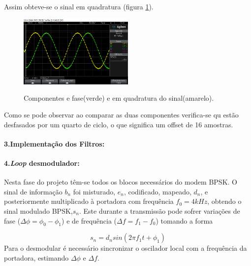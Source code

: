 \documentclass[11pt]{article}
\numberwithin{equation}{section}
\begin{document}
Assim obteve-se o sinal em quadratura (figura \ref{quad}).
\begin{figure}[H]
	\centering
	\includegraphics[width=0.5\textwidth]{./quadratura}~\\
	\caption{Componentes e fase(verde) e em quadratura do sinal(amarelo).}
	\label{quad}
\end{figure}
Como se pode observar ao comparar as duas componentes verifica-se qu estão desfasados por um quarto de ciclo, o que significa um offset de 16 amostras.
\paragraph{3.Implementação dos Filtros:} \hspace{0pt}


\paragraph{4.\textit{Loop} desmodulador:} \hspace{0pt}
 
Nesta fase do projeto têm-se todos os blocos necessários do modem BPSK. O sinal de informação $b_n$ foi misturado, $e_n$, codificado, mapeado, $d_n$, e posteriormente multiplicado à portadora com frequência $f_0 = 4kHz$, obtendo o sinal modulado BPSK,$s_n$. Este durante a transmissão pode sofrer variações de fase ($\Delta\phi=\phi_0-\phi_1$) e de frequência ($\Delta f = f_1-f_0$) tomando a forma 

\begin{equation}
	s_n=d_nsin(2\pi f_1t+ \phi_1)
\end{equation}
 Para o desmodular é necessário sincronizar o oscilador local com a frequência da portadora, estimando $\Delta\phi$ e $\Delta f$.
\end{document}
